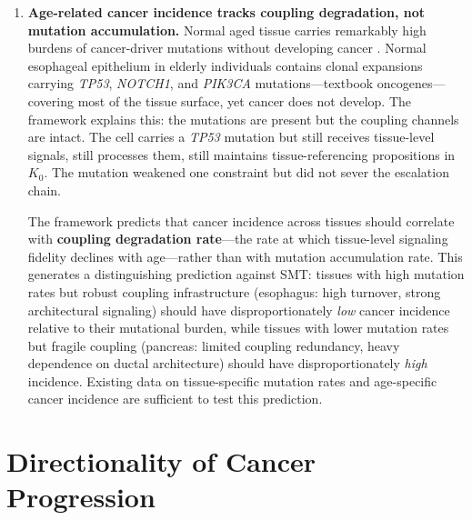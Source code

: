 \documentclass[11pt]{article}
\theoremstyle{definition}
\theoremstyle{remark}
\begin{document}
\begin{enumerate}
   The clinical implication is immediate: \textbf{sequential
   monotherapy is a controlled demolition of the escalation chain},
   one channel at a time. Each line of single-agent therapy removes
   one coupling constraint, and the tumor descends one step. This
   provides a structural argument for simultaneous multi-channel
   intervention over sequential single-channel protocols.

\item \textbf{Age-related cancer incidence tracks coupling
   degradation, not mutation accumulation.} Normal aged tissue
   carries remarkably high burdens of cancer-driver mutations without
   developing cancer \cite{Martincorena2015}. Normal esophageal
   epithelium in elderly individuals contains clonal expansions
   carrying \emph{TP53}, \emph{NOTCH1}, and \emph{PIK3CA}
   mutations---textbook oncogenes---covering most of the tissue
   surface, yet cancer does not develop. The framework explains this:
   the mutations are present but the coupling channels are intact.
   The cell carries a \emph{TP53} mutation but still receives
   tissue-level signals, still processes them, still maintains
   tissue-referencing propositions in $K_0$. The mutation weakened
   one constraint but did not sever the escalation chain.

   The framework predicts that cancer incidence across tissues should
   correlate with \textbf{coupling degradation rate}---the rate at
   which tissue-level signaling fidelity declines with age---rather
   than with mutation accumulation rate. This generates a
   distinguishing prediction against SMT: tissues with high mutation
   rates but robust coupling infrastructure (esophagus: high
   turnover, strong architectural signaling) should have
   disproportionately \emph{low} cancer incidence relative to their
   mutational burden, while tissues with lower mutation rates but
   fragile coupling (pancreas: limited coupling redundancy, heavy
   dependence on ductal architecture) should have
   disproportionately \emph{high} incidence. Existing data on
   tissue-specific mutation rates \cite{Martincorena2015} and
   age-specific cancer incidence are sufficient to test this
   prediction.
\end{enumerate}

\section{Directionality of Cancer Progression}
\label{sec:directionality}
\end{document}
